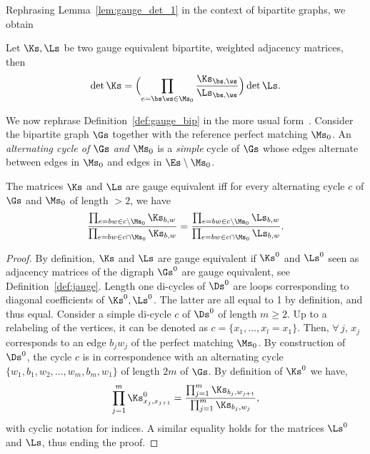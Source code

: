 \documentclass[a4paper,twoside,11pt]{article}
\begin{document}
Rephrasing Lemma~\ref{lem:gauge_det_1} in the context of bipartite graphs, we obtain

\begin{cor}\label{cor:gauge_bip_det}
Let $\Ks,\Ls$ be two gauge equivalent bipartite, weighted adjacency matrices, then
\begin{align*}
\det\Ks =\Bigl(\prod_{e=\bs\ws\in\Ms_0}\frac{\Ks_{\bs,\ws}}{\Ls_{\bs,\ws}}\Bigr) \det \Ls.
\end{align*}
\end{cor}

We now rephrase Definition~\ref{def:gauge_bip} in the more usual form~\cite{Kuperberg,KOS}. 
Consider the bipartite graph $\Gs$ together with the reference perfect matching $\Ms_0$. 
An \emph{alternating cycle of $\Gs$ and $\Ms_0$} is a \emph{simple} cycle of $\Gs$ whose edges alternate
between edges in $\Ms_0$ and edges in $\Es\setminus\Ms_0$. 

\begin{lem}
The matrices $\Ks$ and $\Ls$ are gauge equivalent iff for every alternating cycle $c$ of $\Gs$ and $\Ms_0$ of length $>2$, 
we have
\begin{equation*}
\frac{\prod_{e=bw\in c\setminus \Ms_0}\Ks_{b,w}}{\prod_{e=bw\in c\cap \Ms_0}\Ks_{b,w}}=
\frac{\prod_{e=bw\in c\setminus \Ms_0}\Ls_{b,w}}{\prod_{e=bw\in c\cap \Ms_0}\Ls_{b,w}}.
\end{equation*}
\end{lem}
\begin{proof}
By definition, $\Ks$ and $\Ls$ are gauge equivalent if $\Ks^0$ and $\Ls^0$ seen as adjacency matrices of the digraph $\Gs^0$ are 
gauge equivalent, see Definition~\ref{def:jauge}. Length one di-cycles of $\Ds^0$ 
are loops corresponding to diagonal coefficients of $\Ks^0,
\Ls^0$. The latter are all equal to 1 by definition, and thus equal. 
Consider a simple di-cycle $c$ of $\Ds^0$ of length $m\geq 2$. Up to a relabeling of the vertices, it can be denoted as
$c=\{x_1,\dots,x_l=x_1\}$. Then, $\forall\,j$, $x_j$ corresponds to an edge $b_j w_j$ of the perfect matching $\Ms_0$. 
By construction of $\Ds^0$, the cycle $c$ is in correspondence with an alternating cycle 
$\{w_1,b_1,w_2,\dots,w_m,b_m,w_1\}$ of length $2m$ of $\Gs$. By definition of $\Ks^0$ we have,
\[
\prod_{j=1}^m \Ks^0_{x_j,x_{j+1}}=\frac{\prod_{j=1}^m \Ks_{b_j,w_{j+1}}}{\prod_{j=1}^m \Ks_{b_j,w_{j}}},
\]
with cyclic notation for indices. A similar equality holds for the matrices $\Ls^0$ and $\Ls$, thus ending the proof.
\end{proof}
\end{document}
